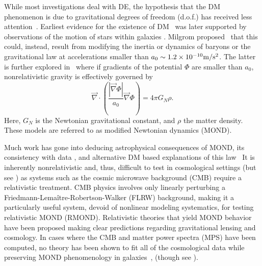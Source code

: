 \documentclass[twocolumn,prl,preprintnumbers,amsmath,amssymb,nofootinbib]{revtex4-2}
\newcommand{\mssq}{\ensuremath{{\rm m/s^2}}}
\newcommand{\grad}{\ensuremath{\vec{\nabla}}}
\newcommand{\GN}{\ensuremath{G_{N}}}
\begin{document}
While most investigations deal with DE,
the hypothesis that the DM phenomenon is due to gravitational degrees of freedom (d.o.f.) has received less attention~\cite{Cembranos:2008gj,Chamseddine:2013kea,Arroja:2015yvd,Sebastiani:2016ras,Casalino:2018tcd,Bettoni:2013zma,Mendoza:2012hu,Rinaldi:2016oqp,Koutsoumbas:2017fxp,Diez-Tejedor:2018fue,Milgrom:2018bit}.
Earliest evidence for the existence of DM~\cite{Oort1932,Zwicky:1933gu,Smith:1936mlg} 
was later supported by observations of the motion of stars within galaxies \cite{Rubin:1970zza,RubinEtAl1980}.
 Milgrom proposed~\cite{Milgrom1983a,Milgrom1983b,Milgrom1983c} that this could, instead, result from modifying the inertia or dynamics of baryons
or  the gravitational law  at accelerations smaller than $a_0\sim 1.2\times 10^{-10} \mssq$.
The latter is further explored in~\cite{BekensteinMilgrom1984} where
if gradients of the potential $\Phi$ are smaller than $a_0$,
nonrelativistic gravity is effectively governed by
\begin{equation}
 \grad \cdot\left(  \frac{|\grad\Phi|}{a_0} \grad \Phi \right)  = 4 \pi \GN \rho.
\label{eq_AQUAL}
\end{equation}
Here, $\GN$ is the Newtonian gravitational constant, and $\rho$ the matter density.
These models are referred to as modified Newtonian dynamics (MOND). 

Much work has gone into deducing astrophysical consequences of MOND, 
its consistency with data \cite{Milgrom1988,Kent1988,GerhardSpergel1992,Begeman:1991iy,Milgrom:1995hz,Sanders:1996ua,Sanders1999,McGaugh:2000sr,SandersMcGaugh2002,McGaugh:2005qe,BinneyFamaey2005,BekensteinMagueijo2006,GentileEtAl2007,MagueijoMozaffari2011,Famaey:2011kh,Heesetal2015,MargalitShaviv2015,McGaughEtAl2016,HodsonZhao2017,BilekEtAl2017,Sanders:2018mnk,LelliEtAl2019,Petersen:2020vks},
and alternative DM based explanations of this law~\cite{Blanchet:2006yt,Blanchet:2009zu,Berezhiani:2015pia,Berezhiani:2015bqa} %
It is inherently nonrelativistic and, thus, difficult to test in cosmological settings (but see \cite{PardoSpergel2020}) as systems such as the cosmic microwave background (CMB) require a relativistic treatment.
CMB physics involves only linearly perturbing a Friedmann-Lema\^itre-Robertson-Walker (FLRW) background,
 making it a particularly useful system, devoid of nonlinear modeling systematics,
 for testing relativistic MOND (RMOND). 
Relativistic theories that yield MOND behavior have been proposed
\cite{BekensteinMilgrom1984,Bekenstein1988,Sanders1997,Bekenstein2004,NavarroVanAcoleyen2005,ZlosnikFerreiraStarkman2006,Sanders2007,Milgrom2009,BabichevDeffayetEsposito-Farese2011,DeffayetEsposito-FareseWoodard2011,Woodard2014,Khoury2014,Blanchet:2015sra,Hossenfelder2017,Burrage:2018zuj,Milgrom:2019rtd,DAmbrosio:2020nev} 
 making clear predictions regarding gravitational lensing and cosmology.
In cases where the CMB and matter power spectra (MPS) have been computed, no theory has been shown to fit all of the cosmological data while
preserving MOND phenomenology in galaxies~\cite{SkordisEtAl2005,BourliotEtAl2006,DodelsonLiguori2006,ZuntzEtAl2010,XuEtAl2014,DaiStojkovic2017,DaiStojkovic22017,ZlosnikSkordis2017,TanWoodard2018}, (though see \cite{Sanders2005}).
\end{document}
